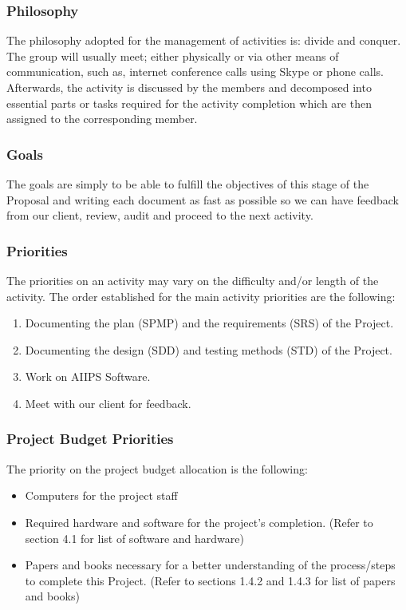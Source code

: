 \documentclass[12pt]{article}
\begin{document}
\subsubsection{Philosophy}
The philosophy adopted for the management of activities is: divide and conquer. The group will usually meet; either physically or via other means of communication, such as, internet conference calls using Skype or phone calls. Afterwards, the activity is discussed by the members and decomposed into essential parts or tasks required for the activity completion which are then assigned to the corresponding member.

\subsubsection{Goals}
The goals are simply to be able to fulfill the objectives of this stage of the Proposal and writing each document as fast as possible so we can have feedback from our client, review, audit and proceed to the next activity. 

\subsubsection{Priorities}
The priorities on an activity may vary on the difficulty and/or length of the activity. The order established for the main activity priorities are the following:

\begin{enumerate}
  \item Documenting the plan (SPMP) and the requirements (SRS) of the Project.
  \item Documenting the design (SDD) and testing methods (STD) of the Project.
  \item Work on AIIPS Software.
  \item Meet with our client for feedback.
\end{enumerate}

\subsubsection{Project Budget Priorities}
The priority on the project budget allocation is the following:
\begin{itemize}
  \item Computers for the project staff
  \item Required hardware and software for the project’s completion. (Refer to section 4.1 for list of software and hardware)
  \item Papers and books necessary for a better understanding of the process/steps to complete this Project. (Refer to sections 1.4.2 and 1.4.3 for list of papers and books)
\end{itemize}
\end{document}

